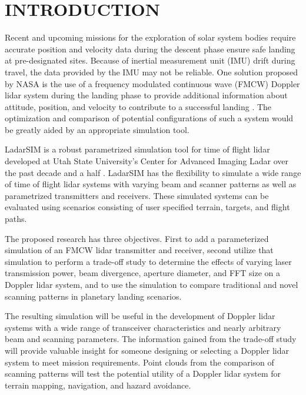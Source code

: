 %
%
%
%

\chapter{INTRODUCTION}
\thispagestyle{empty}
Recent and upcoming missions for the exploration of solar system bodies require accurate
position and velocity data during the descent phase ensure safe landing at pre-designated
sites. Because of inertial measurement unit (IMU) drift during travel, the data provided 
by the IMU may not be reliable. One solution proposed by NASA is the use of a frequency
modulated continuous wave (FMCW) Doppler lidar system during the landing phase to provide
additional information about attitude, position, and velocity to contribute to a successful
landing \cite{amz12,amz12fiber,amz12p2}. The optimization and comparison of potential configurations
of such a system would be greatly aided by an appropriate simulation tool.

LadarSIM is a robust parametrized simulation tool for time of flight lidar
developed at Utah State University's Center
for Advanced Imaging Ladar over the past decade and a half \cite{budgeLeishman,neilsenBudge}.
LadarSIM has the flexibility to simulate a wide range of time of flight
lidar systems with varying beam and scanner patterns as well as parametrized transmitters
and receivers.
These simulated systems can be evaluated using scenarios consisting of
user specified terrain, targets, and flight paths.

The proposed research has three objectives. First to add a parameterized simulation
of an FMCW lidar transmitter and receiver, second utilize that simulation to perform
a trade-off study to determine the effects of varying laser transmission power, beam
divergence, aperture diameter, and FFT size on a Doppler lidar system, and to use the
simulation to compare traditional and novel scanning patterns in planetary landing 
scenarios. 

The resulting simulation will be useful in the development of Doppler lidar systems
with a wide range of transceiver characteristics and nearly arbitrary beam and 
scanning parameters. The information gained from the trade-off study will provide
valuable insight for someone designing or selecting a Doppler lidar system to meet
mission requirements. Point clouds from the comparison of scanning patterns will 
test the potential utility of a Doppler lidar system for terrain mapping, navigation,
and hazard avoidance. 

